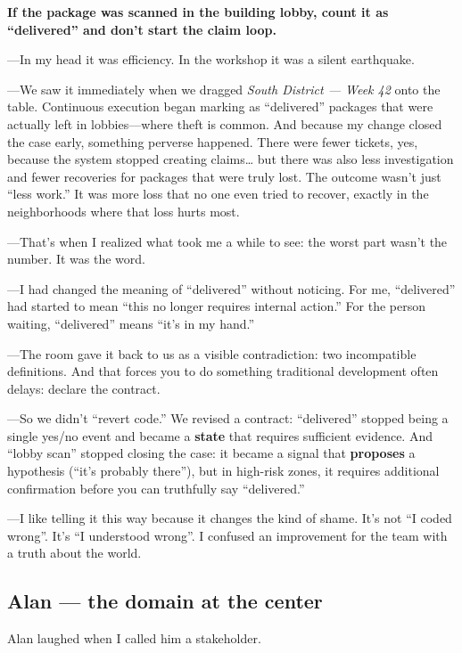 \documentclass[11pt,a4paper]{article}
\begin{document}
\begin{center}
\textbf{If the package was scanned in the building lobby, count it as
``delivered'' and don't start the claim loop.}
\end{center}

---In my head it was efficiency. In the workshop it was a silent earthquake.

---We saw it immediately when we dragged \emph{South District --- Week 42}
onto the table. Continuous execution began marking as ``delivered'' packages
that were actually left in lobbies---where theft is common. And because my
change closed the case early, something perverse happened. There were fewer
tickets, yes, because the system stopped creating claims\ldots{} but there
was also less investigation and fewer recoveries for packages that were truly
lost. The outcome wasn't just ``less work.'' It was more loss that no one
even tried to recover, exactly in the neighborhoods where that loss hurts
most.

---That's when I realized what took me a while to see: the worst part wasn't
the number. It was the word.

---I had changed the meaning of ``delivered'' without noticing. For me,
``delivered'' had started to mean ``this no longer requires internal
action.'' For the person waiting, ``delivered'' means ``it's in my hand.''

---The room gave it back to us as a visible contradiction: two incompatible
definitions. And that forces you to do something traditional development
often delays: declare the contract.

---So we didn't ``revert code.'' We revised a contract: ``delivered'' stopped
being a single yes/no event and became a \textbf{state} that requires
sufficient evidence. And ``lobby scan'' stopped closing the case: it became a
signal that \textbf{proposes} a hypothesis (``it's probably there''), but in
high-risk zones, it requires additional confirmation before you can
truthfully say ``delivered.''

---I like telling it this way because it changes the kind of shame. It's not
``I coded wrong''. It's ``I understood wrong''. I confused an improvement for
the team with a truth about the world.

\subsection{Alan --- the domain at the center}

Alan laughed when I called him a stakeholder.
\end{document}
